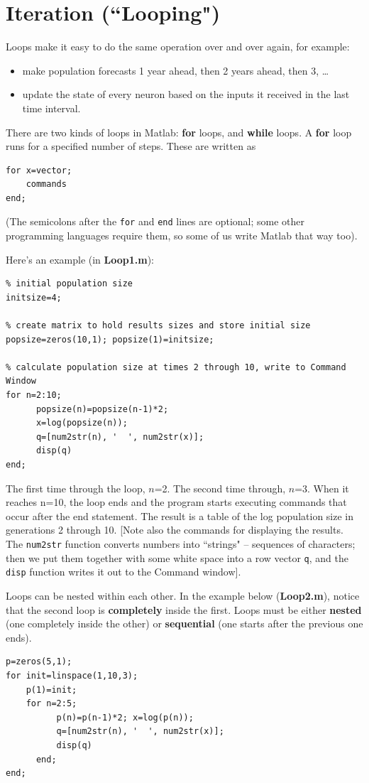 \documentclass [11pt]{article}
\newcommand{\ttt}[1]{\texttt{#1}}
\numberwithin{exercise}{section}
\begin{document}
\section{Iteration (``Looping")}
\vspace{-0.15in}  
Loops make it easy to do the same operation over and over again, for 
example: 
\begin{itemize}
\item make population forecasts 1 year ahead, then 2 years ahead, then 3, {\ldots}
\item update the state of every neuron based on the inputs it received in the last time interval. 
\end{itemize}
There are two kinds of loops in Matlab: \textbf{for} loops, and 
\textbf{while} loops. A \textbf{for} loop runs for a specified number of 
steps. These are written as
\begin{verbatim} 
for x=vector;
    commands
end;
\end{verbatim} 
(The semicolons after the \ttt{for} and \ttt{end} lines are optional; some other
programming languages require them, so some of us write Matlab that way too).  

Here's an example (in \textbf{Loop1.m}): 
\begin{verbatim}
% initial population size
initsize=4; 

% create matrix to hold results sizes and store initial size 
popsize=zeros(10,1); popsize(1)=initsize;

% calculate population size at times 2 through 10, write to Command Window
for n=2:10;  
      popsize(n)=popsize(n-1)*2;
      x=log(popsize(n));
      q=[num2str(n), '  ', num2str(x)];
      disp(q)
end; 
\end{verbatim}

The first time through the loop, $n$=2. The second time through, $n$=3. When it 
reaches n=10, the loop ends and the program starts executing commands that 
occur after the end statement. The result is a table of the log population 
size in generations 2 through 10. [Note also the commands for displaying the 
results. The \texttt{num2str} function converts numbers into ``strings" -- 
sequences of characters; then we put them together with some white space 
into a row vector \texttt{q}, and the \texttt{disp} function writes it out 
to the Command window]. 

Loops can be nested within each other. In the example below 
(\textbf{Loop2.m}), notice that the second loop is \textbf{completely} 
inside the first. Loops must be either \textbf{nested} (one completely 
inside the other) or \textbf{sequential} (one starts after the previous one 
ends). 
\begin{verbatim}
p=zeros(5,1);					            
for init=linspace(1,10,3);			
	p(1)=init; 				            
	for n=2:5;					        	
          p(n)=p(n-1)*2; x=log(p(n));		  
          q=[num2str(n), '  ', num2str(x)];	
          disp(q)				
      end;					           
end;						            
\end{verbatim} 
\end{document}
